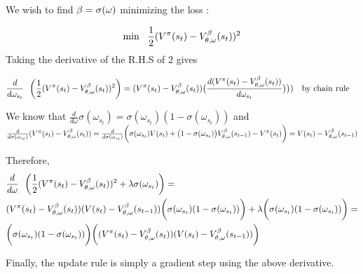 We wish to find $\beta = \sigma(\omega)$ minimizing the loss : 

\begin{align}
    \min \ \ \frac{1}{2}(V^{\pi}(s_t) - V^{\beta}_{\theta,\omega}(s_t))^2  \\
\end{align}
Taking the derivative of the R.H.S of 2 gives

\begin{align}
    \frac{d}{d\omega_{s_t}} \ \ &\bigg( \frac{1}{2}(V^{\pi}(s_t) - V^{\beta}_{\theta,\omega}(s_t))^2  \bigg) =(V^{\pi}(s_t) - V^{\beta}_{\theta,\omega}(s_t)) \big(\frac{d (V^{\pi}(s_t) - V^{\beta}_{\theta,\omega}(s_t))}{d\omega_{s_t}} \big) 
     \big) )  \ \ \ \text{by chain rule}
\end{align}

We know that $\frac{d}{d\omega} \sigma(\omega_{s_t})=\sigma(\omega_{s_t})(1 - \sigma(\omega_{s_t}))$ \newline
and $\frac{d}{d\sigma(\omega_{s_t})} (V^{\pi}(s_t) - V^{\beta}_{\theta,\omega}(s_t)) = \frac{d}{d\sigma(\omega_{s_t})} \bigg(\sigma(\omega_{s_t})V(s_t) + \big(1 - \sigma(\omega_{s_t})\big)V^{\beta}_{\theta,\omega}(s_{t-1}) - V^{\pi}(s_t)\bigg) = V(s_t) - V^{\beta}_{\theta,\omega}(s_{t-1})$ \newline \newline

Therefore, 
\begin{align}
    &\frac{d}{d\omega} \ \ \bigg( \frac{1}{2}(V^{\pi}(s_t) - V^{\beta}_{\theta,\omega}(s_t))^2 + \lambda \sigma(\omega_{s_t}) \bigg) =\\
    &(V^{\pi}(s_t) - V^{\beta}_{\theta,\omega}(s_t)) (V(s_t) - V^{\beta}_{\theta,\omega}(s_{t-1}))\bigg(\sigma(\omega_{s_t})(1 - \sigma(\omega_{s_t}))\bigg)
     + \lambda \bigg(\sigma(\omega_{s_t})(1 - \sigma(\omega_{s_t}))\bigg)  = \\
     &\bigg(\sigma(\omega_{s_t})(1 - \sigma(\omega_{s_t}))\bigg) \bigg((V^{\pi}(s_t) - V^{\beta}_{\theta,\omega}(s_t))(V(s_t) - V^{\beta}_{\theta,\omega}(s_{t-1})) \bigg)
\end{align}

Finally, the update rule is simply a gradient step using the above derivative.




 